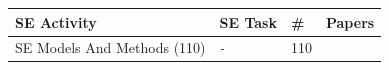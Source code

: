 \begin{tabular} {p{}  p{} p{} p{}} \\ 
\toprule 
SE Activity & SE Task & \# & Papers\\ 
\midrule  
SE Models And Methods ({110}) & \emph{-} & {110} & \cite{ \paperfirst,\paperseventh,\paperninth,\papertenth,\papereleventh,\papersixteenth,\papertwentieth,\papertwentyseventh,\papertwentyeighth,\paperthirtieth,\paperthirtythird,\paperthirtyfourth,\paperthirtysixth,\paperthirtyseventh,\paperthirtyeighth,\paperthirtyninth,\paperfortysecond,\paperfortythird,\paperfiftyfirst,\paperfiftysecond,\paperfiftyseventh,\paperfiftyeighth,\paperfiftyninth,\papersixtysixth,\papersixtyseventh,\papersixtyeighth,\papersixtyninth,\paperseventyfourth,\paperseventysixth,\paperseventyseventh,\paperseventyninth,\papereightyfirst,\papereightyfifth,\papereightysixth,\papereightyseventh,\papereightyeighth,\paperninetyfirst,\paperninetythird,\paperninetyfourth,\paperninetyfifth,\paperninetysixth,\paperninetyseventh,\paperonehundredfifth,\paperonehundredsixth,\paperonehundredseventh,\paperonehundredninth,\paperonehundredtenth,\paperonehundredthirteenth,\paperonehundredfifteenth,\paperonehundrednineteenth,\paperonehundredtwentieth,\paperonehundredtwentythird,\paperonehundredtwentyseventh,\paperonehundredtwentyeighth,\paperonehundredthirtieth,\paperonehundredthirtyfirst,\paperonehundredthirtysecond,\paperonehundredthirtysixth,\paperonehundredthirtyseventh,\paperonehundredthirtyeighth,\paperonehundredthirtyninth,\paperonehundredfortyfourth,\paperonehundredfortysixth,\paperonehundredfortyninth,\paperonehundredfiftieth,\paperonehundredfiftyfirst,\paperonehundredfiftyeighth,\paperonehundredsixtieth,\paperonehundredsixtyfirst,\paperonehundredsixtysecond,\paperonehundredsixtyfifth,\paperonehundredseventieth,\paperonehundredseventysecond,\paperonehundredseventyfourth,\paperonehundredeightieth,\paperonehundredeightyfourth,\paperonehundredninetieth,\paperonehundredninetyfirst,\paperonehundredninetysecond,\paperonehundredninetythird,\paperonehundredninetyfourth,\paperonehundredninetyfifth,\papertwohundredth,\papertwohundredsixth,\papertwohundredseventh,\papertwohundredeighth,\papertwohundredninth,\papertwohundredtenth,\papertwohundredfourteenth,\papertwohundredfifteenth,\papertwohundredsixteenth,\papertwohundrednineteenth,\papertwohundredtwentythird,\papertwohundredtwentyfifth,\papertwohundredtwentysixth,\papertwohundredtwentyninth,\papertwohundredthirtieth,\papertwohundredthirtysecond,\papertwohundredthirtythird,\papertwohundredthirtyfourth,\papertwohundredthirtyfifth,\papertwohundredthirtyseventh,\papertwohundredthirtyninth,\papertwohundredfortieth,\papertwohundredfortyfourth,\papertwohundredfortysixth,\papertwohundredfortyseventh,\papertwohundredfiftyfirst,\papertwohundredfiftysecond,\papertwohundredfiftyfourth }\\ 

\end{tabular}
